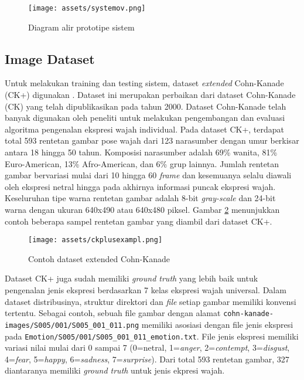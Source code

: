 \documentclass[review,3p,12pt]{elsarticle}
\begin{document}
\begin{figure}[hbt!]
\caption{Diagram alir prototipe sistem}
\label{fig:systemov}
\centering
	\texttt{[image: assets/systemov.png]}
\end{figure}

\subsection{Image Dataset}
\label{imagedataset}

Untuk melakukan training dan testing sistem, dataset \textit{extended} Cohn-Kanade (CK+) digunakan \cite{lucey2010extended}. Dataset ini merupakan perbaikan dari dataset Cohn-Kanade (CK) yang telah dipublikasikan pada tahun 2000. Dataset Cohn-Kanade telah banyak digunakan oleh peneliti untuk melakukan pengembangan dan evaluasi algoritma pengenalan ekspresi wajah individual. Pada dataset CK+, terdapat total 593 rentetan gambar pose wajah dari 123 narasumber dengan umur berkisar antara 18 hingga 50 tahun. Komposisi narasumber adalah 69\% wanita, 81\% Euro-American, 13\% Afro-American, dan 6\% grup lainnya. Jumlah rentetan gambar bervariasi mulai dari 10 hingga 60 \textit{frame} dan kesemuanya selalu diawali oleh ekspresi netral hingga pada akhirnya informasi puncak ekspresi wajah. Keseluruhan tipe warna rentetan gambar adalah 8-bit \textit{gray-scale} dan 24-bit warna dengan ukuran 640x490 atau 640x480 piksel. Gambar \ref{fig:ckplusexampl} menunjukkan contoh beberapa sampel rentetan gambar yang diambil dari dataset CK+.

\begin{figure}[b!]
\caption{Contoh dataset extended Cohn-Kanade}
\label{fig:ckplusexampl}
\centering
	\texttt{[image: assets/ckplusexampl.png]}
\end{figure}

Dataset CK+ juga sudah memiliki \textit{ground truth} yang lebih baik untuk pengenalan jenis ekspresi berdasarkan 7 kelas ekspresi wajah universal. Dalam dataset distribusinya, struktur direktori dan \textit{file} setiap gambar memiliki konvensi tertentu. Sebagai contoh, sebuah file gambar dengan alamat \texttt{cohn-kanade-images/S005/001/S005\_001\_011.png} memiliki asosiasi dengan file jenis ekspresi pada \texttt{Emotion/S005/001/S005\_001\_011\_emotion.txt}. File jenis ekspresi memiliki variasi nilai mulai dari 0 sampai 7 (0=netral, 1=\textit{anger}, 2=\textit{contempt}, 3=\textit{disgust}, 4=\textit{fear}, 5=\textit{happy}, 6=\textit{sadness}, 7=\textit{surprise}). Dari total 593 rentetan gambar, 327 diantaranya memiliki \textit{ground truth} untuk jenis ekpresi wajah.
\end{document}
